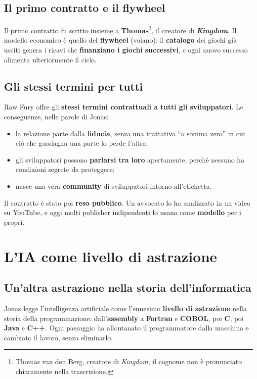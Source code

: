 \subsection{Il primo contratto e il flywheel}

Il primo contratto fu scritto insieme a \textbf{Thomas}\footnote{Thomas van den
Berg, creatore di \emph{Kingdom}; il cognome non è pronunciato chiaramente nella
trascrizione.}, il creatore di \textbf{\emph{Kingdom}}. Il modello economico è
quello del \textbf{flywheel} (volano): il \textbf{catalogo} dei giochi già usciti
genera i ricavi che \textbf{finanziano i giochi successivi}, e ogni nuovo successo
alimenta ulteriormente il ciclo.

\subsection{Gli stessi termini per tutti}

Raw Fury offre gli \textbf{stessi termini contrattuali a tutti gli sviluppatori}.
Le conseguenze, nelle parole di Jonas:
\begin{itemize}
  \item la relazione parte dalla \textbf{fiducia}, senza una trattativa ``a somma
        zero'' in cui ciò che guadagna una parte lo perde l'altra;
  \item gli sviluppatori possono \textbf{parlarsi tra loro} apertamente, perché
        nessuno ha condizioni segrete da proteggere;
  \item nasce una vera \textbf{community} di sviluppatori intorno all'etichetta.
\end{itemize}
Il contratto è stato poi \textbf{reso pubblico}. Un avvocato lo ha analizzato in un
video su YouTube, e oggi molti publisher indipendenti lo usano come
\textbf{modello} per i propri.

\section{L'IA come livello di astrazione}
\label{sec:c2-5-ia}

\subsection{Un'altra astrazione nella storia dell'informatica}

Jonas legge l'intelligenza artificiale come l'ennesimo \textbf{livello di
astrazione} nella storia della programmazione: dall'\textbf{assembly} a
\textbf{Fortran} e \textbf{COBOL}, poi \textbf{C}, poi \textbf{Java} e
\textbf{C++}. Ogni passaggio ha allontanato il programmatore dalla macchina e
cambiato il lavoro, senza eliminarlo.

